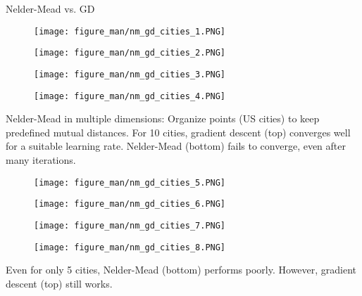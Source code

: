 \documentclass[11pt,compress,t,notes=noshow, xcolor=table]{beamer}
\begin{document}
\begin{vbframe}{Nelder-Mead vs. GD}
\vspace*{-0.5cm}
\begin{figure}
\centering
\begin{minipage}{0.45\textwidth}
\centering
\texttt{[image: figure\_man/nm\_gd\_cities\_1.PNG]}
\end{minipage}\hfill
\begin{minipage}{0.45\textwidth}
\centering
\texttt{[image: figure\_man/nm\_gd\_cities\_2.PNG]}
\end{minipage}
\end{figure}
\begin{figure}
\centering
\begin{minipage}{0.45\textwidth}
\centering
\texttt{[image: figure\_man/nm\_gd\_cities\_3.PNG]}
\end{minipage}\hfill
\begin{minipage}{0.45\textwidth}
\centering
\texttt{[image: figure\_man/nm\_gd\_cities\_4.PNG]}
\end{minipage}
\end{figure}

\begin{footnotesize}
Nelder-Mead in multiple dimensions:
Organize points (US cities) to keep predefined mutual distances.
For 10 cities, gradient descent (top) converges well for a suitable learning rate.
Nelder-Mead (bottom) fails to converge, even after many iterations.
\end{footnotesize}


\framebreak
\vspace*{-0.8cm}
\begin{figure}
\centering
\begin{minipage}{0.45\textwidth}
\centering
\texttt{[image: figure\_man/nm\_gd\_cities\_5.PNG]}
\end{minipage}\hfill
\begin{minipage}{0.45\textwidth}
\centering
\texttt{[image: figure\_man/nm\_gd\_cities\_6.PNG]}
\end{minipage}
\end{figure}
\begin{figure}
\centering
\begin{minipage}{0.45\textwidth}
\centering
\texttt{[image: figure\_man/nm\_gd\_cities\_7.PNG]}
\end{minipage}\hfill
\begin{minipage}{0.45\textwidth}
\centering
\texttt{[image: figure\_man/nm\_gd\_cities\_8.PNG]}
\end{minipage}
\end{figure}
\vspace*{0.5cm}
\begin{footnotesize}
Even for only 5 cities, Nelder-Mead (bottom) performs poorly.
However, gradient descent (top) still works.
\end{footnotesize}

\end{vbframe}


\endlecture
\end{document}
